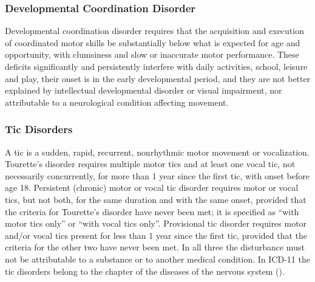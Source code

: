 \subsubsection{Developmental Coordination Disorder}

Developmental coordination disorder requires that the acquisition and execution
of coordinated motor skills be substantially below what is expected for age and
opportunity, with clumsiness and slow or inaccurate motor performance. These deficits significantly and persistently interfere with daily activities,
school, leisure and play, their onset is in the early developmental period, and
they are not better explained by intellectual developmental disorder or visual
impairment, nor attributable to a neurological condition affecting movement.

\subsubsection{Tic Disorders}

A tic is a sudden, rapid, recurrent, nonrhythmic motor movement or
vocalization. Tourette's disorder requires multiple motor tics and at least one
vocal tic, not necessarily concurrently, for more than 1 year since the first
tic, with onset before age 18. Persistent (chronic) motor or vocal tic disorder
requires motor or vocal tics, but not both, for the same duration and with the
same onset, provided that the criteria for Tourette's disorder have never been
met; it is specified as ``with motor tics only'' or ``with vocal tics only''.
Provisional tic disorder requires motor and/or vocal tics present for less than
1 year since the first tic, provided that the criteria for the other two have
never been met. In all three the disturbance must not be attributable
to a substance or to another medical condition. In ICD-11 the tic disorders
belong to the chapter of the diseases of the nervous system ().
